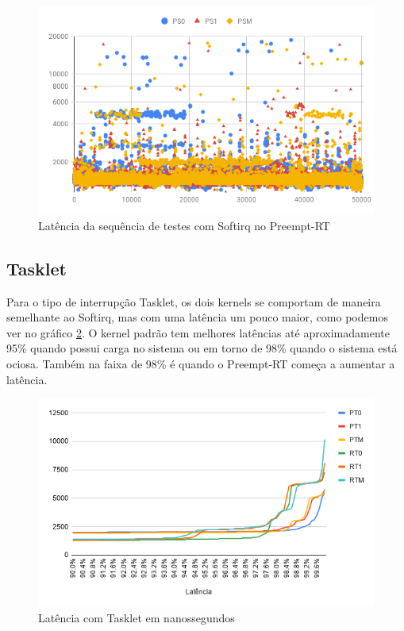 \begin{figure}[!htb]
    \centering
    \includegraphics[width=\textwidth]{graficos/ps-scatter.png}
    \caption{Latência da sequência de testes com Softirq no Preempt-RT}
    \label{grafico:p-softirq}
\end{figure}

\subsection{Tasklet}

Para o tipo de interrupção Tasklet, os dois kernels se comportam de maneira semelhante ao Softirq, mas com uma latência um pouco maior, como podemos ver no gráfico \ref{grafico:tasklet}. O kernel padrão tem melhores latências até aproximadamente 95\% quando possui carga no sistema ou em torno de 98\% quando o sistema está ociosa. Também na faixa de 98\% é quando o Preempt-RT começa a aumentar a latência.

\begin{figure}[!htb]
    \centering
    \includegraphics[width=\textwidth]{graficos/tasklet.png}
    \caption{Latência com Tasklet em nanossegundos}
    \label{grafico:tasklet}
\end{figure}

